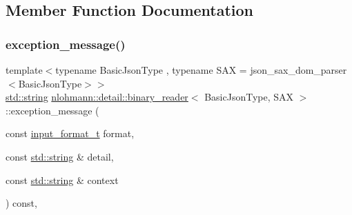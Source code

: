 \subsection{Member Function Documentation}
\mbox{\label{classnlohmann_1_1detail_1_1binary__reader_a82b86133c98a0565446a44dfd3e418e6}} 
\subsubsection{\texorpdfstring{exception\_message()}{exception\_message()}}
{\footnotesize\ttfamily template$<$typename Basic\+Json\+Type , typename S\+AX  = json\+\_\+sax\+\_\+dom\+\_\+parser$<$\+Basic\+Json\+Type$>$$>$ \\
\mbox{\hyperlink{namespacenlohmann_1_1detail_a1ed8fc6239da25abcaf681d30ace4985ab45cffe084dd3d20d928bee85e7b0f21}{std\+::string}} \mbox{\hyperlink{classnlohmann_1_1detail_1_1binary__reader}{nlohmann\+::detail\+::binary\+\_\+reader}}$<$ Basic\+Json\+Type, S\+AX $>$\+::exception\+\_\+message (\begin{DoxyParamCaption}\item[{const \mbox{\hyperlink{namespacenlohmann_1_1detail_aa554fc6a11519e4f347deb25a9f0db40}{input\+\_\+format\+\_\+t}}}]{format,  }\item[{const \mbox{\hyperlink{namespacenlohmann_1_1detail_a1ed8fc6239da25abcaf681d30ace4985ab45cffe084dd3d20d928bee85e7b0f21}{std\+::string}} \&}]{detail,  }\item[{const \mbox{\hyperlink{namespacenlohmann_1_1detail_a1ed8fc6239da25abcaf681d30ace4985ab45cffe084dd3d20d928bee85e7b0f21}{std\+::string}} \&}]{context }\end{DoxyParamCaption}) const\hspace{0.3cm}{\ttfamily [inline]}, {\ttfamily [private]}}


